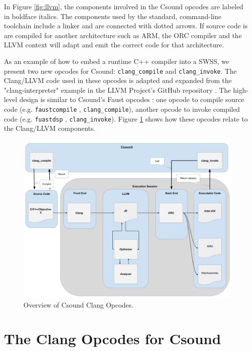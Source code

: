 \documentclass[letterpaper, 12pt]{article}
\begin{document}
In Figure \ref{fig:llvm}, the components involved in the Csound opcodes are labeled in boldface italics. The components used by the standard, command-line toolchain include a linker and are connected with dotted arrows. If source code is are compiled for another architecture such as ARM, the ORC compiler and the LLVM context will adapt and emit the correct code for that architecture.

As an example of how to embed a runtime C++ compiler into a SWSS, we present two new opcodes for Csound: \texttt{clang\_compile} and \texttt{clang\_invoke}. The Clang/LLVM code used in these opcodes is adapted and expanded from the "clang-interpreter" example in the LLVM Project's GitHub repository \citep{clanginterpreter}. The high-level design is similar to Csound's Faust opcodes \citep{Lazzarini2014}: one opcode to compile source code (e.g. \texttt{faustcompile} \citep{faustcompile}, \texttt{clang\_compile}), another opcode to invoke compiled code (e.g. \texttt{fuastdsp} \citep{faustdsp}, \texttt{clang\_invoke}). Figure \ref{fig:clangopcodes} shows how these opcodes relate to the Clang/LLVM components.

\begin{figure}[]
\begin{center}
\includegraphics[width=\textwidth,height=\textheight,keepaspectratio]{EmbeddedCLangLLVMArchitecture}\caption{Overview of Csound Clang Opcodes.}
\label{fig:clangopcodes}
\end{center}
\end{figure}

\section{The Clang Opcodes for Csound}
\end{document}
